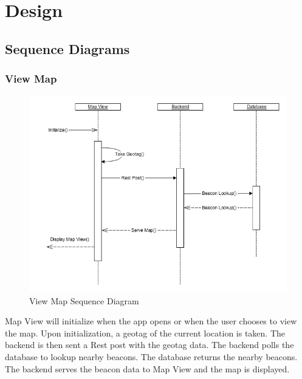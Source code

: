 \section{Design}
    \subsection{Sequence Diagrams}
        \subsubsection{View Map}
            \begin{figure}[H]
                \centering
                \includegraphics[width=\textwidth]{src/img/view-map.png}
                \caption{View Map Sequence Diagram} 
            \end{figure}

            Map View will initialize when the app opens or when the user chooses
            to view the map. Upon initialization, a geotag of the current
            location is taken. The backend is then sent a Rest post with the
            geotag data. The backend polls the database to lookup nearby
            beacons. The database returns the nearby beacons. The backend serves
            the beacon data to Map View and the map is displayed. 

